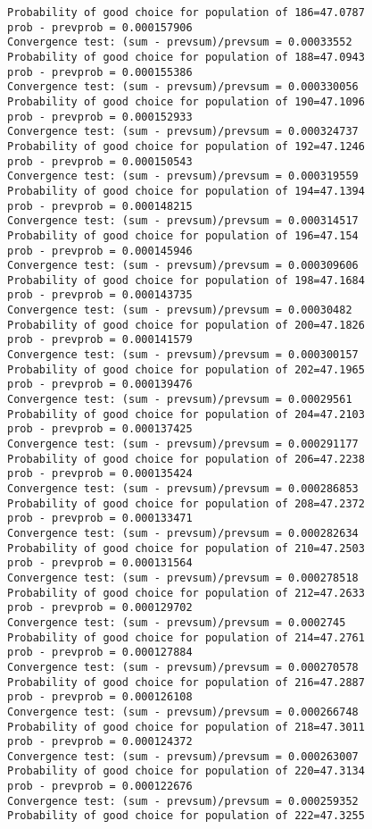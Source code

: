 \documentclass[11pt,onecolumn]{article}
\begin{document}
\begin{verbatim}
Probability of good choice for population of 186=47.0787
prob - prevprob = 0.000157906
Convergence test: (sum - prevsum)/prevsum = 0.00033552
Probability of good choice for population of 188=47.0943
prob - prevprob = 0.000155386
Convergence test: (sum - prevsum)/prevsum = 0.000330056
Probability of good choice for population of 190=47.1096
prob - prevprob = 0.000152933
Convergence test: (sum - prevsum)/prevsum = 0.000324737
Probability of good choice for population of 192=47.1246
prob - prevprob = 0.000150543
Convergence test: (sum - prevsum)/prevsum = 0.000319559
Probability of good choice for population of 194=47.1394
prob - prevprob = 0.000148215
Convergence test: (sum - prevsum)/prevsum = 0.000314517
Probability of good choice for population of 196=47.154
prob - prevprob = 0.000145946
Convergence test: (sum - prevsum)/prevsum = 0.000309606
Probability of good choice for population of 198=47.1684
prob - prevprob = 0.000143735
Convergence test: (sum - prevsum)/prevsum = 0.00030482
Probability of good choice for population of 200=47.1826
prob - prevprob = 0.000141579
Convergence test: (sum - prevsum)/prevsum = 0.000300157
Probability of good choice for population of 202=47.1965
prob - prevprob = 0.000139476
Convergence test: (sum - prevsum)/prevsum = 0.00029561
Probability of good choice for population of 204=47.2103
prob - prevprob = 0.000137425
Convergence test: (sum - prevsum)/prevsum = 0.000291177
Probability of good choice for population of 206=47.2238
prob - prevprob = 0.000135424
Convergence test: (sum - prevsum)/prevsum = 0.000286853
Probability of good choice for population of 208=47.2372
prob - prevprob = 0.000133471
Convergence test: (sum - prevsum)/prevsum = 0.000282634
Probability of good choice for population of 210=47.2503
prob - prevprob = 0.000131564
Convergence test: (sum - prevsum)/prevsum = 0.000278518
Probability of good choice for population of 212=47.2633
prob - prevprob = 0.000129702
Convergence test: (sum - prevsum)/prevsum = 0.0002745
Probability of good choice for population of 214=47.2761
prob - prevprob = 0.000127884
Convergence test: (sum - prevsum)/prevsum = 0.000270578
Probability of good choice for population of 216=47.2887
prob - prevprob = 0.000126108
Convergence test: (sum - prevsum)/prevsum = 0.000266748
Probability of good choice for population of 218=47.3011
prob - prevprob = 0.000124372
Convergence test: (sum - prevsum)/prevsum = 0.000263007
Probability of good choice for population of 220=47.3134
prob - prevprob = 0.000122676
Convergence test: (sum - prevsum)/prevsum = 0.000259352
Probability of good choice for population of 222=47.3255

\end{verbatim}
\end{document}
